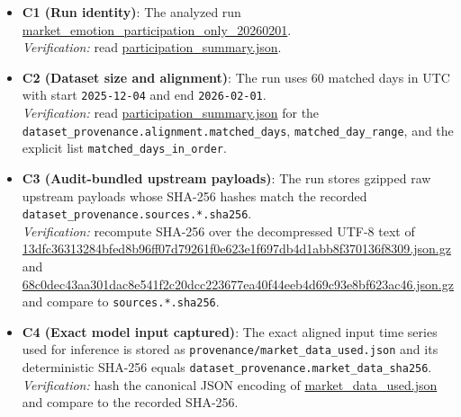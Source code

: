 \documentclass[12pt,a4paper]{article}
\begin{document}
\begin{itemize}
	\item \textbf{C1 (Run identity)}: The analyzed run \\ \href{https://github.com/jhcragin/SpiralBrain-v3.0-public/tree/main/Emotion-Conditioned%20Risk%20Posture%20in%20Crypto%20Markets/results}{market_emotion_participation_only_20260201}. \\
	\emph{Verification:} read \href{https://github.com/jhcragin/SpiralBrain-v3.0-public/blob/main/Emotion-Conditioned%20Risk%20Posture%20in%20Crypto%20Markets/results/participation_summary.json}{participation_summary.json}.

	\item \textbf{C2 (Dataset size and alignment)}: The run uses 60 matched days in UTC with start \texttt{2025-12-04} and end \texttt{2026-02-01}. \\
	\emph{Verification:} read \href{https://github.com/jhcragin/SpiralBrain-v3.0-public/blob/main/Emotion-Conditioned%20Risk%20Posture%20in%20Crypto%20Markets/results/participation_summary.json}{participation_summary.json} for the \texttt{dataset\_provenance.alignment.matched\_days}, \texttt{matched\_day\_range}, and the explicit list \texttt{matched\_days\_in\_order}.

	\item \textbf{C3 (Audit-bundled upstream payloads)}: The run stores gzipped raw upstream payloads whose SHA-256 hashes match the recorded \\ \texttt{dataset\_provenance.sources.*.sha256}. \\
	\emph{Verification:} recompute SHA-256 over the decompressed UTF-8 text of \\ \href{https://github.com/jhcragin/SpiralBrain-v3.0-public/blob/main/Emotion-Conditioned%20Risk%20Posture%20in%20Crypto%20Markets/results/provenance/raw/13dfc36313284bfed8b96ff07d79261f0e623e1f697db4d1abb8f370136f8309.json.gz}{13dfc36313284bfed8b96ff07d79261f0e623e1f697db4d1abb8f370136f8309.json.gz} and \\ \href{https://github.com/jhcragin/SpiralBrain-v3.0-public/blob/main/Emotion-Conditioned%20Risk%20Posture%20in%20Crypto%20Markets/results/provenance/raw/68c0dec43aa301dac8e541f2c20dcc223677ea40f44eeb4d69c93e8bf623ac46.json.gz}{68c0dec43aa301dac8e541f2c20dcc223677ea40f44eeb4d69c93e8bf623ac46.json.gz} and compare to \texttt{sources.*.sha256}.

	\item \textbf{C4 (Exact model input captured)}: The exact aligned input time series used for inference is stored as \texttt{provenance/market\_data\_used.json} and its deterministic SHA-256 equals \texttt{dataset\_provenance.market\_data\_sha256}. \\
	\emph{Verification:} hash the canonical JSON encoding of \href{https://github.com/jhcragin/SpiralBrain-v3.0-public/blob/main/Emotion-Conditioned%20Risk%20Posture%20in%20Crypto%20Markets/results/provenance/market_data_used.json}{market_data_used.json} and compare to the recorded SHA-256.


\end{itemize}
\end{document}
